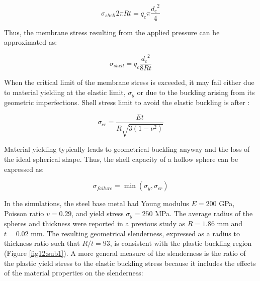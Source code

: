 \documentclass[review]{elsarticle}
\begin{document}
{\begin{equation}\label{Eq1}
\sigma_{shell}2\pi Rt=q_c\pi \frac{{d_c}^{2}}{4}
\end{equation}


Thus, the membrane stress resulting from the applied pressure can be approximated as:

\begin{equation}\label{Eq2}
\sigma_{shell}=q_c\frac{{d_c}^{2}}{8Rt}
\end{equation}

When the critical limit of the membrane stress is exceeded, it may fail either due to material yielding at the elastic limit, $\sigma_y$ or due to the buckling arising from its geometric imperfections. Shell stress limit to avoid the elastic buckling is after \cite{TimGer2009}:

\begin{equation}\label{Eq3}
\sigma_{cr}=\frac{Et}{R\sqrt{3(1-\nu^2)}}
\end{equation}

Material yielding typically leads to geometrical buckling anyway and the loss of the ideal spherical shape. Thus, the shell capacity of a hollow sphere can be expressed as:

\begin{equation}\label{Eq4}
\sigma_{failure}=\min(\sigma_y,\sigma_{cr})
\end{equation}

In the simulations, the steel base metal had Young modulus $E=200$ GPa, Poisson ratio $v=0.29$, and yield stress $\sigma_y=250$ MPa. The average radius of the spheres and thickness were reported in a previous study \cite{Szyniszewskietal2014} as $R = 1.86$ mm and $t = 0.02$ mm. The resulting geometrical slenderness, expressed as a radius to thickness ratio such that $R/t = 93$, is consistent with the plastic buckling region (Figure \ref{fig12:sub1}). A more general measure of the slenderness is the ratio of the plastic yield stress to the elastic buckling stress because it includes the effects of the material properties on the slenderness:

}
\end{document}
